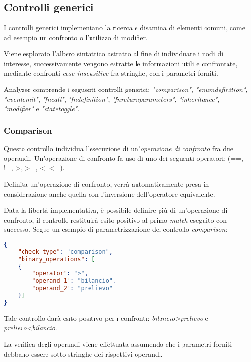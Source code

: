 \subsection{Controlli generici}
I controlli generici implementano la ricerca e disamina di elementi comuni, come ad esempio un confronto o l'utilizzo di modifier.\par
Viene esplorato l'albero sintattico astratto al fine di individuare i nodi di interesse, successivamente vengono estratte le informazioni utili e confrontate, mediante confronti \textit{case-insensitive} fra stringhe, con i parametri forniti.\par
Analyzer comprende i seguenti controlli generici: \textit{"comparison"}, \textit{"enum\textunderscore definition"}, \textit{"event\textunderscore emit"}, \textit{"fn\textunderscore call"}, \textit{"fn\textunderscore definition"}, \textit{"fn\textunderscore return\textunderscore parameters"}, \textit{"inheritance"}, \textit{"modifier"} e \textit{"state\textunderscore toggle"}.
\subsubsection{Comparison}
Questo controllo individua l'esecuzione di un'\textit{operazione di confronto} fra due operandi. Un'operazione di confronto fa uso di uno dei seguenti operatori: (==, !=, \textgreater, \textgreater =, \textless, \textless =).\par
Definita un'operazione di confronto, verrà automaticamente presa in considerazione anche quella con l'inversione dell'operatore equivalente.\par
Data la libertà implementativa, è possibile definire più di un'operazione di confronto, il controllo restituirà esito positivo al primo \textit{match} eseguito con successo.
Segue un esempio di parametrizzazione del controllo \textit{comparison}:
{\begin{lstlisting}[language=json, caption={Parametrizzazione del controllo Comparison}]
{
	"check_type": "comparison",
	"binary_operations": [
	{
		"operator": ">",
		"operand_1": "bilancio",
		"operand_2": "prelievo"
	}]
}\end{lstlisting}}
\noindent Tale controllo darà esito positivo per i confronti: \textit{bilancio\textgreater prelievo} e \textit{prelievo\textless bilancio}.\par
La verifica degli operandi viene effettuata assumendo che i parametri forniti debbano essere sotto-stringhe dei rispettivi operandi.

